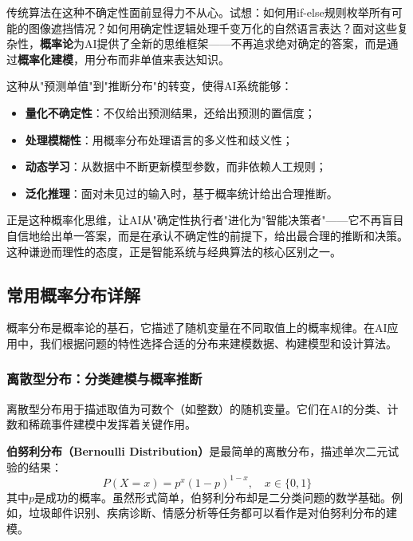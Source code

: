 传统算法在这种不确定性面前显得力不从心。试想：如何用if-else规则枚举所有可能的图像遮挡情况？如何用确定性逻辑处理千变万化的自然语言表达？面对这些复杂性，\textbf{概率论}为AI提供了全新的思维框架——不再追求绝对确定的答案，而是通过\textbf{概率化建模}，用分布而非单值来表达知识。

这种从"预测单值"到"推断分布"的转变，使得AI系统能够：
\begin{itemize}
  \item \textbf{量化不确定性}：不仅给出预测结果，还给出预测的置信度；
  \item \textbf{处理模糊性}：用概率分布处理语言的多义性和歧义性；
  \item \textbf{动态学习}：从数据中不断更新模型参数，而非依赖人工规则；
  \item \textbf{泛化推理}：面对未见过的输入时，基于概率统计给出合理推断。
\end{itemize}

正是这种概率化思维，让AI从"确定性执行者"进化为"智能决策者"——它不再盲目自信地给出单一答案，而是在承认不确定性的前提下，给出最合理的推断和决策。这种谦逊而理性的态度，正是智能系统与经典算法的核心区别之一。%

\subsection{常用概率分布详解}

概率分布是概率论的基石，它描述了随机变量在不同取值上的概率规律。在AI应用中，我们根据问题的特性选择合适的分布来建模数据、构建模型和设计算法。

\subsubsection{离散型分布：分类建模与概率推断}

离散型分布用于描述取值为可数个（如整数）的随机变量。它们在AI的分类、计数和稀疏事件建模中发挥着关键作用。

\textbf{伯努利分布（Bernoulli Distribution）}是最简单的离散分布，描述单次二元试验的结果：
\begin{equation}
P(X=x) = p^x(1-p)^{1-x}, \quad x \in \{0, 1\}
\end{equation}
其中$p$是成功的概率。虽然形式简单，伯努利分布却是二分类问题的数学基础。例如，垃圾邮件识别、疾病诊断、情感分析等任务都可以看作是对伯努利分布的建模。

